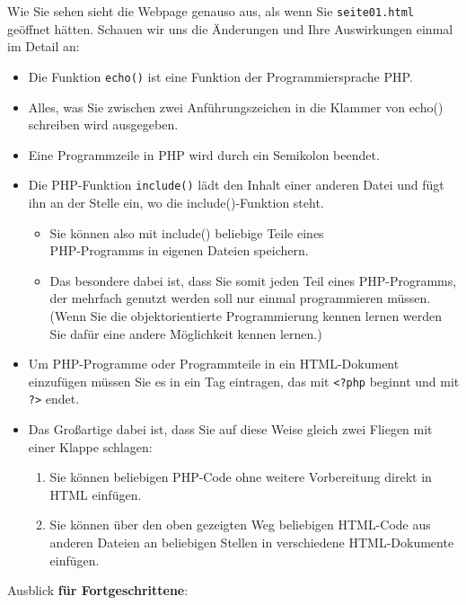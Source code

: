 Wie Sie sehen sieht die Webpage genauso aus, als wenn Sie \verb|seite01.html| geöffnet hätten. Schauen wir uns die Änderungen und Ihre Auswirkungen einmal im Detail an:

\begin{itemize}
	\item Die Funktion \verb|echo()| ist eine Funktion der Programmiersprache PHP.
	\item Alles, was Sie zwischen zwei Anführungszeichen in die Klammer von echo() schreiben wird ausgegeben.
	\item Eine Programmzeile in PHP wird durch ein Semikolon beendet.
	\item Die PHP-Funktion \verb|include()| lädt den Inhalt einer anderen Datei und fügt ihn an der Stelle ein, wo die include()-Funktion steht.
	\begin{itemize}
		\item Sie können also mit include() beliebige Teile eines \\PHP-Programms in eigenen Dateien speichern.
		\item Das besondere dabei ist, dass Sie somit jeden Teil eines PHP-Programms, der mehrfach genutzt werden soll nur einmal programmieren müssen. (Wenn Sie die objektorientierte Programmierung kennen lernen werden Sie dafür eine andere Möglichkeit kennen lernen.)
	\end{itemize}
	\item Um PHP-Programme oder Programmteile in ein HTML-Dokument einzufügen müssen Sie es in ein Tag eintragen, das mit \verb|<?php| beginnt und mit \verb|?>| endet.
	\item Das Großartige dabei ist, dass Sie auf diese Weise gleich zwei Fliegen mit einer Klappe schlagen:
	\begin{enumerate}
		\item Sie können beliebigen PHP-Code ohne weitere Vorbereitung direkt in HTML einfügen.
		\item Sie können über den oben gezeigten Weg beliebigen HTML-Code aus anderen Dateien an beliebigen Stellen in verschiedene HTML-Dokumente einfügen.
	\end{enumerate}
\end{itemize}

Ausblick \textbf{für Fortgeschrittene}: 

